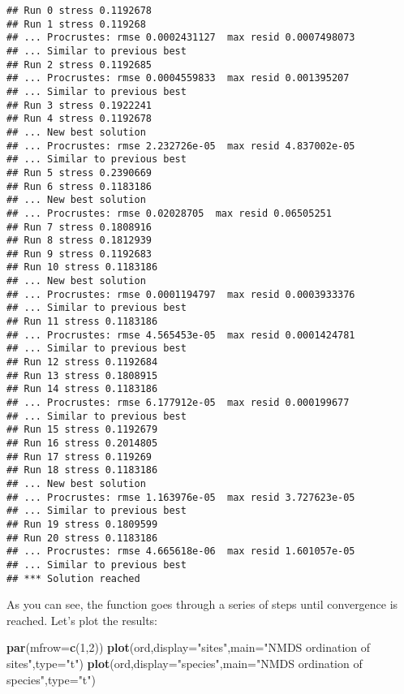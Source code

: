 \documentclass[
]{book}
\newenvironment{Shaded}{\begin{snugshade}}{\end{snugshade}}
\newcommand{\DataTypeTok}[1]{\textcolor[rgb]{0.13,0.29,0.53}{#1}}
\newcommand{\DecValTok}[1]{\textcolor[rgb]{0.00,0.00,0.81}{#1}}
\newcommand{\KeywordTok}[1]{\textcolor[rgb]{0.13,0.29,0.53}{\textbf{#1}}}
\newcommand{\NormalTok}[1]{#1}
\newcommand{\StringTok}[1]{\textcolor[rgb]{0.31,0.60,0.02}{#1}}
\begin{document}
\begin{verbatim}
## Run 0 stress 0.1192678 
## Run 1 stress 0.119268 
## ... Procrustes: rmse 0.0002431127  max resid 0.0007498073 
## ... Similar to previous best
## Run 2 stress 0.1192685 
## ... Procrustes: rmse 0.0004559833  max resid 0.001395207 
## ... Similar to previous best
## Run 3 stress 0.1922241 
## Run 4 stress 0.1192678 
## ... New best solution
## ... Procrustes: rmse 2.232726e-05  max resid 4.837002e-05 
## ... Similar to previous best
## Run 5 stress 0.2390669 
## Run 6 stress 0.1183186 
## ... New best solution
## ... Procrustes: rmse 0.02028705  max resid 0.06505251 
## Run 7 stress 0.1808916 
## Run 8 stress 0.1812939 
## Run 9 stress 0.1192683 
## Run 10 stress 0.1183186 
## ... New best solution
## ... Procrustes: rmse 0.0001194797  max resid 0.0003933376 
## ... Similar to previous best
## Run 11 stress 0.1183186 
## ... Procrustes: rmse 4.565453e-05  max resid 0.0001424781 
## ... Similar to previous best
## Run 12 stress 0.1192684 
## Run 13 stress 0.1808915 
## Run 14 stress 0.1183186 
## ... Procrustes: rmse 6.177912e-05  max resid 0.000199677 
## ... Similar to previous best
## Run 15 stress 0.1192679 
## Run 16 stress 0.2014805 
## Run 17 stress 0.119269 
## Run 18 stress 0.1183186 
## ... New best solution
## ... Procrustes: rmse 1.163976e-05  max resid 3.727623e-05 
## ... Similar to previous best
## Run 19 stress 0.1809599 
## Run 20 stress 0.1183186 
## ... Procrustes: rmse 4.665618e-06  max resid 1.601057e-05 
## ... Similar to previous best
## *** Solution reached
\end{verbatim}

As you can see, the function goes through a series of steps until convergence is reached. Let's plot the results:

\begin{Shaded}
\begin{Highlighting}[]
\KeywordTok{par}\NormalTok{(}\DataTypeTok{mfrow=}\KeywordTok{c}\NormalTok{(}\DecValTok{1}\NormalTok{,}\DecValTok{2}\NormalTok{))}
\KeywordTok{plot}\NormalTok{(ord,}\DataTypeTok{display=}\StringTok{"sites"}\NormalTok{,}\DataTypeTok{main=}\StringTok{"NMDS ordination of sites"}\NormalTok{,}\DataTypeTok{type=}\StringTok{"t"}\NormalTok{)}
\KeywordTok{plot}\NormalTok{(ord,}\DataTypeTok{display=}\StringTok{"species"}\NormalTok{,}\DataTypeTok{main=}\StringTok{"NMDS ordination of species"}\NormalTok{,}\DataTypeTok{type=}\StringTok{"t"}\NormalTok{)}
\end{Highlighting}
\end{Shaded}
\end{document}
